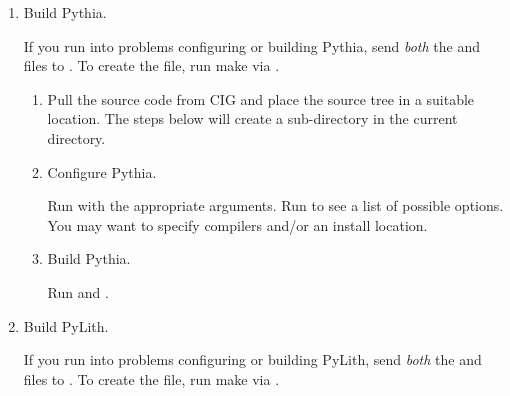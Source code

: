 \begin{enumerate}
\item Build Pythia.

  \begin{tip}
    If you run into problems configuring or building Pythia, send
    {\em both} the  and
     files to
    . To create the
     file, run make via .
  \end{tip}

  \begin{enumerate}
  \item Pull the source code from CIG and place the source tree in a
    suitable location. The steps below will create a
     sub-directory in the current directory.

    \begin{screen}
      \shellprompt{}
    \end{screen}
    
  \item Configure Pythia.
    
    Run  with the appropriate arguments.
    Run  to see a list of possible
    options. You may want to specify compilers and/or an install
    location.

    \begin{screen}
      \shellprompt{}
      \shellprompt{}
      \shellprompt{}
    \end{screen}

  \item Build Pythia.

    Run  and .

    \begin{screen}
      \shellprompt{}
      \shellprompt{}
    \end{screen}
    
  \end{enumerate}

\item Build PyLith.

  \begin{tip}
    If you run into problems configuring or building PyLith, send
    {\em both} the  and
     files to
    . To create the
     file, run make via .
  \end{tip}


\end{enumerate}

